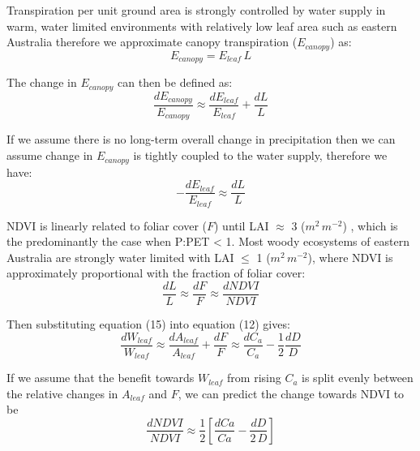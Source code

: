 \documentclass[gc, manuscript]{copernicus}
\begin{document}
Transpiration per unit ground area is strongly controlled by water
supply in warm, water limited environments with relatively low leaf area
such as eastern Australia \citep{spechtWaterUsePerennial1972} therefore
we approximate canopy transpiration (\(E_{canopy}\)) as:
\begin{equation}
E_{canopy}=E_{leaf}\,L
\end{equation}

The change in \(E_{canopy}\) can then be defined as: \begin{equation}
\frac{dE_{canopy}}{E_{canopy}} \approx \frac{dE_{leaf}}{E_{leaf}}+\frac{dL}{L}
\end{equation}

If we assume there is no long-term overall change in precipitation then
we can assume change in \(E_{canopy}\) is tightly coupled to the water
supply, therefore we have: \begin{equation}
-\frac{dE_{leaf}}{E_{leaf}} \approx \frac{dL}{L}
\end{equation}

NDVI is linearly related to foliar cover (\(F\)) until LAI \(\approx\) 3
(\(m^2\,m^{-2}\)) \citep{carlsonRelationNDVIFractional1997a}, which is
the predominantly the case when P:PET \textless{} 1. Most woody
ecosystems of eastern Australia are strongly water limited with LAI
\(\leq\) 1 (\(m^2\,m^{-2}\)), where NDVI is approximately proportional
with the fraction of foliar cover: \begin{equation}
\frac{dL}{L}\approx\frac{dF}{F}\approx\frac{d NDVI}{NDVI}
\end{equation}

Then substituting equation (15) into equation (12) gives:
\begin{equation}
\frac{dW_{leaf}}{W_{leaf}} \approx  \frac{dA_{leaf}}{A_{leaf}} + \frac{dF}{F} \approx \frac{dC_a}{C_a} - \frac{1}{2}\frac{dD}{D}
\end{equation}

If we assume that the benefit towards \(W_{leaf}\) from rising \(C_a\)
is split evenly between the relative changes in \(A_{leaf}\) and \(F\),
we can predict the change towards NDVI to be \begin{equation}
\frac{dNDVI}{NDVI} \approx \frac{1}{2}[\frac{dCa}{Ca}-\frac{dD}{2\,D}]
\end{equation}
\end{document}
